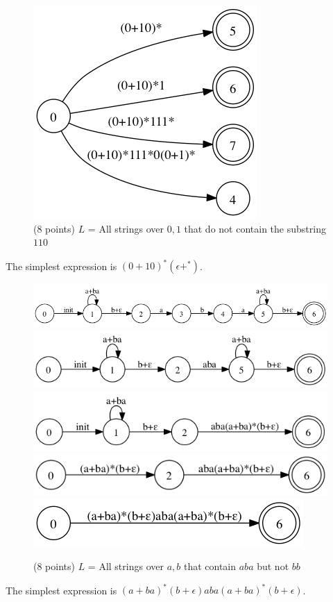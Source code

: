 \documentclass[paper=a4, fontsize=11pt]{scrartcl} %
\begin{document}
\begin{figure}[hp]
  \includegraphics[scale=.5]{1-2.gv.5.png}
  \caption{(8 points) $L$ = All strings over ${0,1}$ that do not
    contain the substring $110$}
\end{figure}
The simplest expression is $(0+10)^*(\epsilon + ^*)$.

\begin{figure}[hp]
  \centering
  \includegraphics[scale=.5]{1-3.gv.png}
  \includegraphics[scale=.5]{1-3.gv.2.png}
  \includegraphics[scale=.5]{1-3.gv.3.png}
  \includegraphics[scale=.5]{1-3.gv.4.png}
  \includegraphics[scale=.5]{1-3.gv.5.png}
  \caption{(8 points) $L$ = All strings over ${a,b}$ that contain $aba$ but not $bb$}
\end{figure}
The simplest expression is $(a+ba)^*(b+\epsilon)aba(a+ba)^*(b+\epsilon)$.
\end{document}
